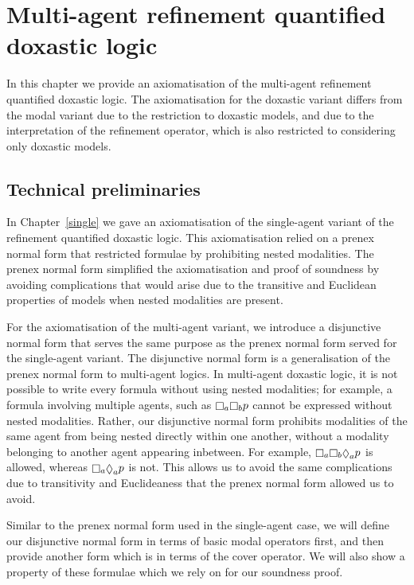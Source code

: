 \chapter{Multi-agent refinement quantified doxastic logic}\label{kd45}

In this chapter we provide an axiomatisation of the multi-agent refinement
quantified doxastic logic. The axiomatisation for the doxastic variant differs
from the modal variant due to the restriction to doxastic models, and due to the
interpretation of the refinement operator, which is also restricted to
considering only doxastic models.

\section{Technical preliminaries}

In Chapter~\ref{single} we gave an axiomatisation of the single-agent variant of
the refinement quantified doxastic logic. This axiomatisation relied on a
prenex normal form that restricted formulae by prohibiting nested modalities.
The prenex normal form simplified the axiomatisation and proof of soundness by
avoiding complications that would arise due to the transitive and Euclidean
properties of \classKD{} models when nested modalities are present.

For the axiomatisation of the multi-agent variant, we introduce a disjunctive
normal form that serves the same purpose as the prenex normal form served for
the single-agent variant. The disjunctive normal form is a generalisation of the
prenex normal form to multi-agent logics. In multi-agent doxastic logic, it is
not possible to write every formula without using nested modalities; for
example, a formula involving multiple agents, such as $\knows_a \knows_b p$
cannot be expressed without nested modalities. Rather, our disjunctive normal
form prohibits modalities of the same agent from being nested directly within
one another, without a modality belonging to another agent appearing inbetween.
For example, $\knows_a \knows_b \suspects_a p$ is allowed, whereas $\knows_a
\suspects_a p$ is not. This allows us to avoid the same complications due to
transitivity and Euclideaness that the prenex normal form allowed us to avoid.

Similar to the prenex normal form used in the single-agent case, we will define
our disjunctive normal form in terms of basic modal operators first, and then
provide another form which is in terms of the cover operator. We will also show
a property of these formulae which we rely on for our soundness proof.

